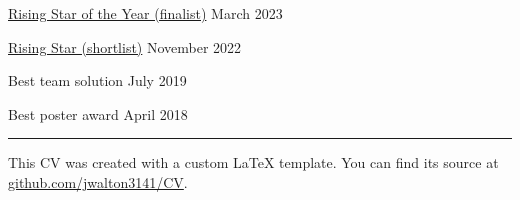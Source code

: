 \documentclass[12pt, a4paper]{article}
\begin{document}

%
          {\href{https://predatech.co.uk/british-data-awards-2023-finalists-announced/}%
                {Rising Star of the Year (finalist)}}%
          {March 2023}

%
          {\href{https://www.dynamonortheast.co.uk/dynamites22-shortlist-unveiled/}%
                {Rising Star (shortlist)}}%
          {November 2022}

%
          {Best team solution}%
          {July 2019}

%
          {Best poster award}%
          {April 2018}

\vfill
\hypersetup{urlcolor=light-grey}%
\color{light-grey}%
\rule{\textwidth}{1.25pt}

\footnotesize\raggedleft This CV was created with a custom \LaTeX{}
template. You can find its source at
\href{https://github.com/jwalton3141/CV}{github.com/jwalton3141/CV}.
\end{document}
